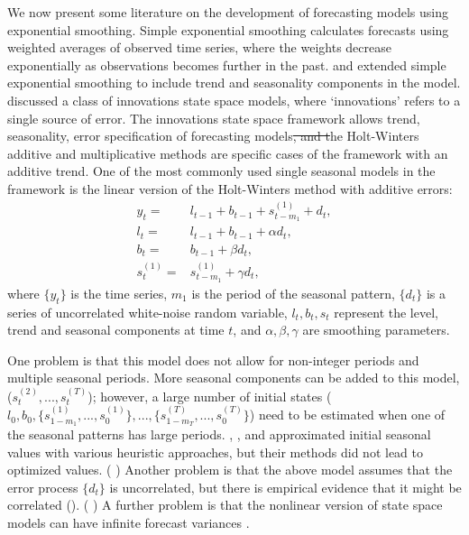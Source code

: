 \documentclass{uwstat572}
\newcommand{\vmdel}[1]{\sout{#1}}
\newcommand{\vmadd}[1]{\textbf{\color{red}{#1}}}
\newcommand{\vmcomment}[1]{({\color{blue}{VM's comment:}} \textbf{\color{blue}{#1}})}
\begin{document}
We now present some literature on the development of forecasting models using exponential smoothing. Simple exponential smoothing calculates forecasts using weighted averages of observed time series, where the weights decrease exponentially as observations becomes further in the past. \citet{holt1957forecasting} and \citet{winters1960forecasting} extended simple exponential smoothing to include trend and seasonality components in the model. \citet{hyndman2002state} discussed a class of innovations state space models, where `innovations' refers to a single source of error. 
The innovations state space framework allows \vmadd{for} trend, seasonality, \vmadd{and} error specification of forecasting models\vmadd{.}\vmdel{, and t}\vmadd{T}he Holt-Winters additive and multiplicative methods are specific cases of the framework with an additive trend. One of the most commonly used single seasonal models in the framework is the linear version of the Holt-Winters method with additive errors:
\begin{subequations}
\begin{align}
 y_t=&l_{t-1}+b_{t-1}+s_{t-m_1}^{(1)}+d_t, \label{eqn:measurement.simple}\\
 l_t=&l_{t-1}+b_{t-1}+\alpha d_t,\label{eqn:level.simple} \\
 b_t=&b_{t-1}+\beta d_t,\label{eqn:trend.simple} \\
 s_t^{(1)}=&s_{t-m_1}^{(1)}+\gamma d_t,\label{eqn:error.simple}
\end{align}
\label{eqn:simple}
\end{subequations}
where $\{y_t\}$ is the time series, $m_1$ is the period of the seasonal pattern, $\{d_t\}$ is a series of uncorrelated white-noise random variable, $l_t, b_t, s_t$ represent the level, trend and seasonal components at time $t$, and $\alpha,\beta,\gamma$ are smoothing parameters.

One problem is that this model does not allow for non-integer periods and multiple seasonal periods. More seasonal components can be added to this model, ($s_t^{(2)},...,s_t^{(T)}$); however, a large number of initial states ($l_0, b_0, \{ s^{(1)}_{1-m_1}, ..., s_0^{(1)} \},...,  \{ s^{(T)}_{1-m_T}, ..., s_0^{(T)} \}$) need to be estimated when one of the seasonal patterns has large periods. 
\citet{taylor2003short}, \citet{taylor2010triple}, and \citet{gould2008forecasting} approximated initial seasonal values with various heuristic approaches, but their methods did not lead to optimized values. \vmcomment{I don't understand what you mean by ``optimized values''. Do you refer to computational/numerical or statistical problems of these methods?} 
Another problem is that the above model assumes that the error process $\{d_t\}$ is uncorrelated, but there is empirical evidence that it might be correlated (\citet{taylor2003short}).
\vmcomment{Not clear how what is a correlated/noncorrelated process --- rephrase.} 
A further problem is that the nonlinear version of state space models can have infinite forecast variances \citep{akram2009exponential}. 
\end{document}
